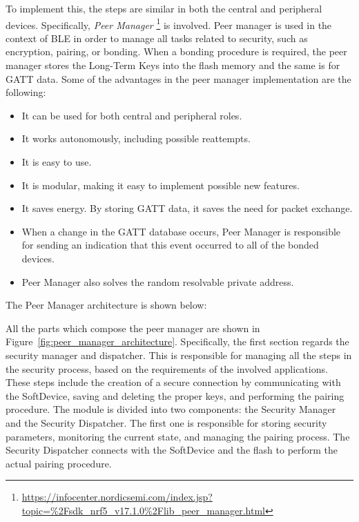 \documentclass{Configuration_Files/PoliMi3i_thesis}
\begin{document}
To implement this, the steps are similar in both the central and peripheral devices. Specifically, \textit{Peer Manager} \footnote{\url{https://infocenter.nordicsemi.com/index.jsp?topic=\%2Fsdk_nrf5_v17.1.0\%2Flib_peer_manager.html}} is involved. Peer manager is used in the context of BLE in order to manage all tasks related to security, such as encryption, pairing, or bonding. When a bonding procedure is required, the peer manager stores the Long-Term Keys into the flash memory and the same is for GATT data. Some of the advantages in the peer manager implementation are the following:

\begin{itemize}
    \item It can be used for both central and peripheral roles.
    \item It works autonomously, including possible reattempts.
    \item It is easy to use.
    \item It is modular, making it easy to implement possible new features.
    \item It saves energy. By storing GATT data, it saves the need for packet exchange.
    \item When a change in the GATT database occurs, Peer Manager is responsible for sending an indication that this event occurred to all of the bonded devices.
    \item Peer Manager also solves the random resolvable private address.
\end{itemize}

The Peer Manager architecture is shown below:


All the parts which compose the peer manager are shown in Figure~\ref{fig:peer_manager_architecture}. Specifically, the first section regards the security manager and dispatcher. This is responsible for managing all the steps in the security process, based on the requirements of the involved applications. These steps include the creation of a secure connection by communicating with the SoftDevice, saving and deleting the proper keys, and performing the pairing procedure. The module is divided into two components: the Security Manager and the Security Dispatcher. The first one is responsible for storing security parameters, monitoring the current state, and managing the pairing process. The Security Dispatcher connects with the SoftDevice and the flash to perform the actual pairing procedure.
\end{document}
